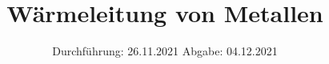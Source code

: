 

\subject{VERSUCH 204}
\title{Wärmeleitung von Metallen}
\date{%
  Durchführung: 26.11.2021
  \hspace{3em}
  Abgabe: 04.12.2021
}



\maketitle
\thispagestyle{empty}
\tableofcontents
\newpage






\printbibliography{}



